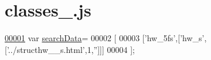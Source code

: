 \hypertarget{classes__4_8js_source}{}\section{classes\+\_.\+js}
\label{classes__4_8js_source}

\begin{DoxyCode}
\hypertarget{classes__4_8js_source.tex_l00001}{}\hyperlink{classes__4_8js_ad01a7523f103d6242ef9b0451861231e}{00001} var \hyperlink{classes__4_8js_ad01a7523f103d6242ef9b0451861231e}{searchData}=
00002 [
00003   [\textcolor{stringliteral}{'hw\_5fs'},[\textcolor{stringliteral}{'hw\_s'},[\textcolor{stringliteral}{'../structhw\_\_s.html'},1,\textcolor{stringliteral}{''}]]]
00004 ];
\end{DoxyCode}
